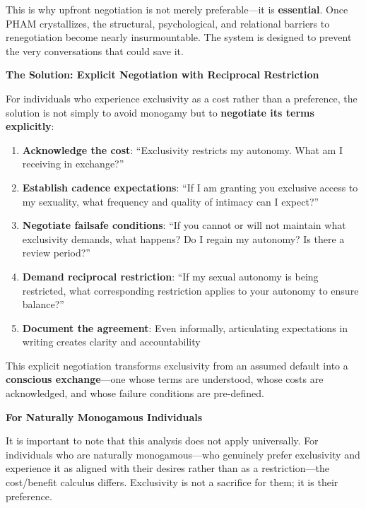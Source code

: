 \documentclass[12pt, letterpaper]{article}
\begin{document}
This is why upfront negotiation is not merely preferable---it is \textbf{essential}. Once PHAM crystallizes, the structural, psychological, and relational barriers to renegotiation become nearly insurmountable. The system is designed to prevent the very conversations that could save it.

\textbf{The Solution: Explicit Negotiation with Reciprocal Restriction}

For individuals who experience exclusivity as a cost rather than a preference, the solution is not simply to avoid monogamy but to \textbf{negotiate its terms explicitly}:

\begin{enumerate}
    \item \textbf{Acknowledge the cost}: ``Exclusivity restricts my autonomy. What am I receiving in exchange?''
    
    \item \textbf{Establish cadence expectations}: ``If I am granting you exclusive access to my sexuality, what frequency and quality of intimacy can I expect?''
    
    \item \textbf{Negotiate failsafe conditions}: ``If you cannot or will not maintain what exclusivity demands, what happens? Do I regain my autonomy? Is there a review period?''
    
    \item \textbf{Demand reciprocal restriction}: ``If my sexual autonomy is being restricted, what corresponding restriction applies to your autonomy to ensure balance?''
    
    \item \textbf{Document the agreement}: Even informally, articulating expectations in writing creates clarity and accountability
\end{enumerate}

This explicit negotiation transforms exclusivity from an assumed default into a \textbf{conscious exchange}---one whose terms are understood, whose costs are acknowledged, and whose failure conditions are pre-defined.

\textbf{For Naturally Monogamous Individuals}

It is important to note that this analysis does not apply universally. For individuals who are naturally monogamous---who genuinely prefer exclusivity and experience it as aligned with their desires rather than as a restriction---the cost/benefit calculus differs. Exclusivity is not a sacrifice for them; it is their preference.
\end{document}
